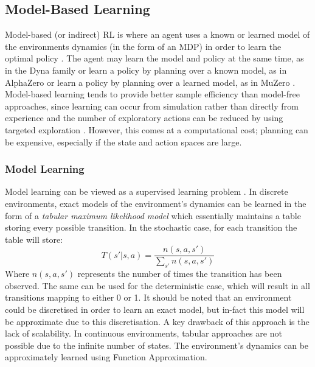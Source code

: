 \subsection{Model-Based Learning}
Model-based (or indirect) RL is where an agent uses a known or learned model of the environments dynamics (in the form of an MDP) in order to learn the optimal policy \cite{MAL-086, RLSOTA11}. The agent may learn the model and policy at the same time, as in the Dyna family \cite{Sutton:1990, 10.1145/122344.122377} or learn a policy by planning over a known model, as in AlphaZero \cite{DBLP:journals/corr/abs-1712-01815} or learn a policy by planning over a learned model, as in MuZero \cite{DBLP:journals/corr/abs-1911-08265}.
Model-based learning tends to provide better sample efficiency than model-free approaches, since learning can occur from simulation rather than directly from experience \cite{RLSOTA11} and the number of exploratory actions can be reduced by using targeted exploration \cite{Thrun-1992-15850}. However, this comes at a computational cost; planning can be expensive, especially if the state and action spaces are large.
\subsubsection{Model Learning}
Model learning can be viewed as a supervised learning problem \cite{JORDAN1992307}. In discrete environments, exact models of the environment's dynamics can be learned in the form of a \textit{tabular maximum likelihood model} \cite{10.1145/122344.122377} which essentially maintains a table storing every possible transition. In the stochastic case, for each transition the table will store:
$$T(s'|s,a) = \frac{n(s, a, s')}{\sum_{s'}n(s,a,s')}$$
Where $n(s,a,s')$ represents the number of times the transition has been observed.
The same can be used for the deterministic case, which will result in all transitions mapping to either 0 or 1. It should be noted that an environment could be discretised in order to learn an exact model, but in-fact this model will be approximate due to this discretisation.
A key drawback of this approach is the lack of scalability.
In continuous environments, tabular approaches are not possible due to the infinite number of states. The environment's dynamics can be approximately learned using Function Approximation.

